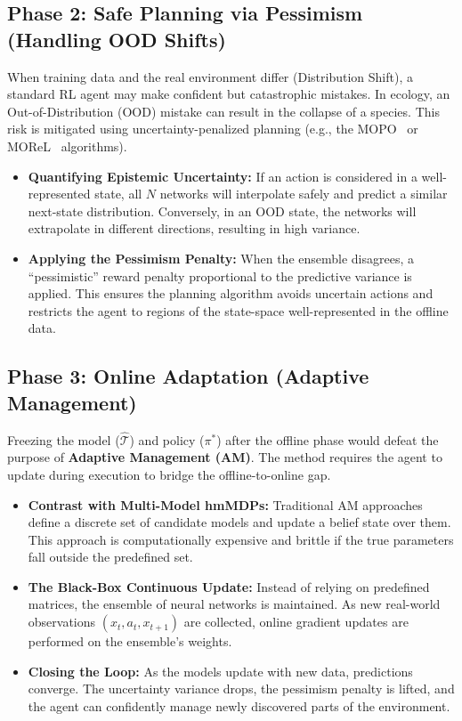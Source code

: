 \documentclass[11pt]{article}
\begin{document}
\subsection{Phase 2: Safe Planning via Pessimism (Handling OOD Shifts)}
When training data and the real environment differ (Distribution Shift), a standard RL agent may make confident but catastrophic mistakes. In ecology, an Out-of-Distribution (OOD) mistake can result in the collapse of a species. This risk is mitigated using uncertainty-penalized planning (e.g., the MOPO~\cite{yu2020mopo} or MOReL~\cite{kidambi2020morel} algorithms).

\begin{itemize}
    \item \textbf{Quantifying Epistemic Uncertainty:} If an action is considered in a well-represented state, all $N$ networks will interpolate safely and predict a similar next-state distribution. Conversely, in an OOD state, the networks will extrapolate in different directions, resulting in high variance.
    \item \textbf{Applying the Pessimism Penalty:} When the ensemble disagrees, a ``pessimistic'' reward penalty proportional to the predictive variance is applied. This ensures the planning algorithm avoids uncertain actions and restricts the agent to regions of the state-space well-represented in the offline data.
\end{itemize}

\subsection{Phase 3: Online Adaptation (Adaptive Management)}
Freezing the model ($\hat{\mathcal{T}}$) and policy ($\pi^*$) after the offline phase would defeat the purpose of \textbf{Adaptive Management (AM)}. The method requires the agent to update during execution to bridge the offline-to-online gap.

\begin{itemize}
    \item \textbf{Contrast with Multi-Model hmMDPs:} Traditional AM approaches define a discrete set of candidate models and update a belief state over them. This approach is computationally expensive and brittle if the true parameters fall outside the predefined set.
    \item \textbf{The Black-Box Continuous Update:} Instead of relying on predefined matrices, the ensemble of neural networks is maintained. As new real-world observations $(x_t, a_t, x_{t+1})$ are collected, online gradient updates are performed on the ensemble's weights. 
    \item \textbf{Closing the Loop:} As the models update with new data, predictions converge. The uncertainty variance drops, the pessimism penalty is lifted, and the agent can confidently manage newly discovered parts of the environment.
\end{itemize}
\end{document}
